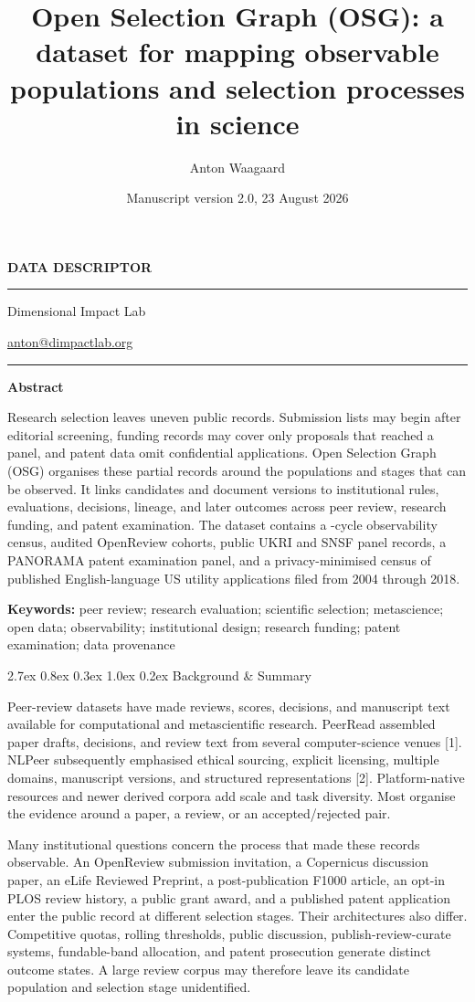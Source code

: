 \documentclass[
  10pt,
]{article}
\title{Open Selection Graph (OSG): a dataset for mapping observable
populations and selection processes in science}
\author{Anton Waagaard}
\date{Manuscript version 2.0, 23 August 2026}
\makeatletter
\renewcommand\section{\@startsection{section}{1}{\z@}%
  {2.7ex \@plus 0.8ex \@minus 0.3ex}%
  {1.0ex \@plus 0.2ex}%
  {\normalfont\Large\sffamily\bfseries\color{OSGInk}}}
\renewcommand{\maketitle}{%
  \thispagestyle{plain}%
  \begin{flushleft}%
    {\small\sffamily\bfseries\color{OSGInk} DATA DESCRIPTOR\par}%
    \vspace{0.55em}%
    {\color{OSGInk}\rule{\textwidth}{1.1pt}\par}%
    \vspace{1.0em}%
    {\fontsize{21}{25}\selectfont\sffamily\bfseries\color{OSGInk}\@title\par}%
    \vspace{1.15em}%
    {\large\sffamily\bfseries\@author\par}%
    \vspace{0.25em}%
    {\small\sffamily Dimensional Impact Lab\par}%
    {\small\sffamily\href{mailto:anton@dimpactlab.org}{anton@dimpactlab.org}\par}%
    \vspace{0.75em}%
    {\small\sffamily\color{OSGRule}\@date\par}%
    \vspace{0.75em}%
    {\color{OSGRule}\rule{\textwidth}{0.45pt}\par}%
  \end{flushleft}%
  \vspace{0.55em}%
}
\renewenvironment{abstract}{%
  \begin{minipage}{\textwidth}%
  {\sffamily\bfseries\color{OSGInk} Abstract\par}%
  \vspace{0.35em}\small
}{%
  \end{minipage}\par\vspace{0.7em}%
}
\makeatother
\begin{document}
\maketitle

\begin{abstract}
Research selection leaves uneven public records. Submission lists may
begin after editorial screening, funding records may cover only
proposals that reached a panel, and patent data omit confidential
applications. Open Selection Graph (OSG) organises these partial records
around the populations and stages that can be observed. It links
candidates and document versions to institutional rules, evaluations,
decisions, lineage, and later outcomes across peer review, research
funding, and patent examination. The dataset contains a
\OSGClaimObservabilityCensusCycles{}-cycle observability census, audited
OpenReview cohorts, public UKRI and SNSF panel records, a PANORAMA patent
examination panel, and a privacy-minimised census of
\OSGClaimHupdPublicApplications{} published English-language US utility
applications filed from 2004 through 2018.
\end{abstract}

\textbf{Keywords:} peer review; research evaluation; scientific
selection; metascience; open data; observability; institutional
design; research funding; patent examination; data provenance

\section{Background \& Summary}\label{background-summary}

Peer-review datasets have made reviews, scores, decisions, and
manuscript text available for computational and metascientific research.
PeerRead assembled paper drafts, decisions, and review text from several
computer-science venues {[}1{]}. NLPeer subsequently emphasised ethical
sourcing, explicit licensing, multiple domains, manuscript versions, and
structured representations {[}2{]}. Platform-native resources and newer
derived corpora add scale and task diversity. Most organise the evidence
around a paper, a review, or an accepted/rejected pair.

Many institutional questions concern the process that made these
records observable. An OpenReview submission invitation, a Copernicus
discussion paper, an eLife Reviewed Preprint, a post-publication F1000
article, an opt-in PLOS review history, a public grant award, and a
published patent application enter the public record at different
selection stages. Their architectures also differ. Competitive quotas,
rolling thresholds, public discussion, publish-review-curate systems,
fundable-band allocation, and patent prosecution generate distinct
outcome states. A large review corpus may therefore leave its candidate
population and selection stage unidentified.
\end{document}
